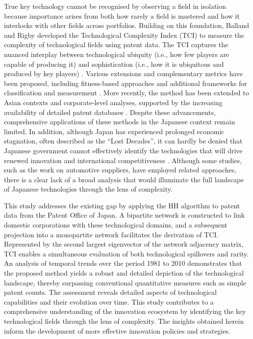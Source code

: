 \documentclass[fleqn,10pt]{wlscirep}
\begin{document}
True key technology cannot be recognised by observing a field in isolation because importance arises from both how rarely a field is mastered and how it interlocks with other fields across portfolios.
Building on this foundation, Balland and Rigby \cite{Balland2016} developed the Technological Complexity Index (TCI) to measure the complexity of technological fields using patent data. 
The TCI captures the nuanced interplay between technological ubiquity (i.e., how few players are capable of producing it) and sophistication (i.e., how it is ubiquitous and produced by key players) \cite{Balland2018}. 
Various extensions and complementary metrics have been proposed, including fitness-based approaches \cite{Tacchella2012,Wu2016,Albeaik2017} and additional frameworks for classification and measurement \cite{Schmoch2008,Soete1987,Balassa1965,Mealy2019,PintarEssletzbichler2022}.
More recently, the method has been extended to Asian contexts and corporate-level analyses, supported by the increasing availability of detailed patent databases \cite{Jun2023,Dong2021}. 
Despite these advancements, comprehensive applications of these methods in the Japanese context remain limited. 
In addition, although Japan has experienced prolonged economic stagnation, often described as the “Lost Decades”, it can hardly be denied that Japanese government cannot effectively identify the technologies that will drive renewed innovation and international competitiveness \cite{Kobayashi2024}. 
Although some studies, such as the work on automotive suppliers\cite{Kito2018}, have employed related approaches, there is a clear lack of a broad analysis that would illuminate the full landscape of Japanese technologies through the lens of complexity.

This study addresses the existing gap by applying the HH algorithm to patent data from the Patent Office of Japan.
A bipartite network is constructed to link domestic corporations with these technological domains, and a subsequent projection into a monopartite network facilitates the derivation of TCI.
Represented by the second largest eigenvector of the network adjacency matrix, TCI enables a simultaneous evaluation of both technological spillovers and rarity.
An analysis of temporal trends over the period 1981 to 2010 demonstrates that the proposed method yields a robust and detailed depiction of the technological landscape, thereby surpassing conventional quantitative measures such as simple patent counts.
The assessment reveals detailed aspects of technological capabilities and their evolution over time.
This study contributes to a comprehensive understanding of the innovation ecosystem by identifying the key technological fields through the lens of complexity.
The insights obtained herein inform the development of more effective innovation policies and strategies.
\end{document}

